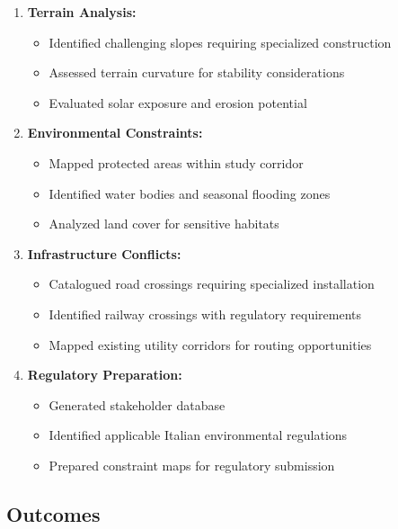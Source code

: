 \documentclass[11pt,letterpaper]{article}
\begin{document}
\begin{enumerate}[leftmargin=*]
    \item \textbf{Terrain Analysis:}
    \begin{itemize}
        \item Identified challenging slopes requiring specialized construction
        \item Assessed terrain curvature for stability considerations
        \item Evaluated solar exposure and erosion potential
    \end{itemize}
    
    \item \textbf{Environmental Constraints:}
    \begin{itemize}
        \item Mapped protected areas within study corridor
        \item Identified water bodies and seasonal flooding zones
        \item Analyzed land cover for sensitive habitats
    \end{itemize}
    
    \item \textbf{Infrastructure Conflicts:}
    \begin{itemize}
        \item Catalogued road crossings requiring specialized installation
        \item Identified railway crossings with regulatory requirements
        \item Mapped existing utility corridors for routing opportunities
    \end{itemize}
    
    \item \textbf{Regulatory Preparation:}
    \begin{itemize}
        \item Generated stakeholder database
        \item Identified applicable Italian environmental regulations
        \item Prepared constraint maps for regulatory submission
    \end{itemize}
\end{enumerate}

\subsection{Outcomes}
\end{document}
